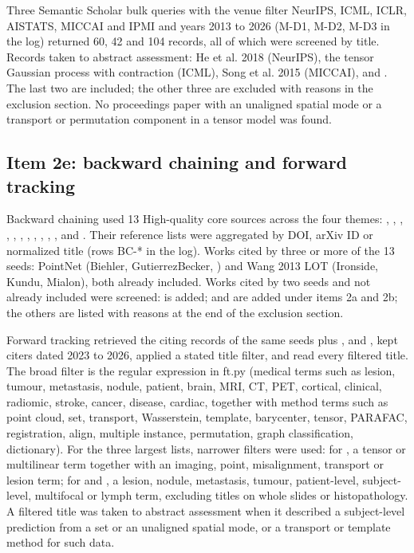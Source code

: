 \documentclass[journal,onecolumn]{IEEEtran}
\begin{document}
Three Semantic Scholar bulk queries with the venue filter NeurIPS, ICML, ICLR, AISTATS, MICCAI and IPMI and years 2013 to 2026 (M-D1, M-D2, M-D3 in the log) returned 60, 42 and 104 records, all of which were screened by title. Records taken to abstract assessment: He et al. 2018 (NeurIPS), the tensor Gaussian process with contraction (ICML), Song et al. 2015 (MICCAI), \cite{Tripathi2023Tensor} and \cite{Adeli2017Joint}. The last two are included; the other three are excluded with reasons in the exclusion section. No proceedings paper with an unaligned spatial mode or a transport or permutation component in a tensor model was found.

\subsection{Item 2e: backward chaining and forward tracking}

Backward chaining used 13 High-quality core sources across the four themes: \cite{Zhou2013Tensor}, \cite{Tang2026Unaligned}, \cite{Biehler2024ANTLER}, \cite{Huang2026ShiftAware}, \cite{VincentCuaz2022Template}, \cite{Thual2022Aligning}, \cite{Kundu2018Discovery}, \cite{Mialon2021Trainable}, \cite{Zaheer2017DeepSets}, \cite{GutierrezBecker2018MSPNet}, \cite{Chen2024TractGeoNet}, \cite{Bowren2022Poststroke} and \cite{Ironside2025Predictive}. Their reference lists were aggregated by DOI, arXiv ID or normalized title (rows BC-* in the log). Works cited by three or more of the 13 seeds: PointNet (Biehler, GutierrezBecker, \cite{Chen2024TractGeoNet}) and Wang 2013 LOT (Ironside, Kundu, Mialon), both already included. Works cited by two seeds and not already included were screened: \cite{Togninalli2019Wasserstein} is added; \cite{Peyre2016Gromov} and \cite{Peyre2019Computational} are added under items 2a and 2b; the others are listed with reasons at the end of the exclusion section.

Forward tracking retrieved the citing records of the same seeds plus \cite{Chen2021AMINN}, \cite{Wang2013Linear} and \cite{Ilse2018AttentionMIL}, kept citers dated 2023 to 2026, applied a stated title filter, and read every filtered title. The broad filter is the regular expression in ft.py (medical terms such as lesion, tumour, metastasis, nodule, patient, brain, MRI, CT, PET, cortical, clinical, radiomic, stroke, cancer, disease, cardiac, together with method terms such as point cloud, set, transport, Wasserstein, template, barycenter, tensor, PARAFAC, registration, align, multiple instance, permutation, graph classification, dictionary). For the three largest lists, narrower filters were used: for \cite{Zhou2013Tensor}, a tensor or multilinear term together with an imaging, point, misalignment, transport or lesion term; for \cite{Zaheer2017DeepSets} and \cite{Ilse2018AttentionMIL}, a lesion, nodule, metastasis, tumour, patient-level, subject-level, multifocal or lymph term, excluding titles on whole slides or histopathology. A filtered title was taken to abstract assessment when it described a subject-level prediction from a set or an unaligned spatial mode, or a transport or template method for such data.
\end{document}
